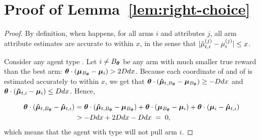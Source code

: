 \section{Proof of Lemma~\ref{lem:right-choice}}
\label{sec:lemma7-proof}


\begin{proof}
By definition, when  happens,
for all arms $i$ and attributes $j$,
all arm attribute estimates are accurate to within $x$,
in the sense that
$|\hat{\mu}_{t,i}^{(j)} - \mu_{i}^{(j)}| \leq x$.

Consider any agent type \AgV.
Let $i \neq B_{\bm{\theta}}$ be any arm
with much smaller true reward than the best arm:
$\bm{\theta} \cdot (\bm{\mu}_{B_{\bm{\theta}}} - \bm{\mu}_{i}) > 2D d x$.
Because each coordinate of  and of
 is estimated accurately to within $x$, 
we get that 
$\bm{\theta} \cdot (\bm{\hat{\mu}}_{t,B_{\bm{\theta}}} - \bm{\mu}_{B_{\bm{\theta}}})
\geq - D d x$
and
$\bm{\theta} \cdot (\bm{\hat{\mu}}_{t,i} - \bm{\mu}_{i}) \leq D d x$.
Hence, 

\begin{align}
\bm{\theta} \cdot (\bm{\hat{\mu}}_{t,B_{\bm{\theta}}} - \bm{\hat{\mu}}_{t,i})
& =
\bm{\theta} \cdot (\bm{\hat{\mu}}_{t,B_{\bm{\theta}}} - \bm{\mu}_{B_{\bm{\theta}}})
+ \bm{\theta} \cdot (\bm{\mu}_{B_{\bm{\theta}}} - \bm{\mu}_{i})
+ \bm{\theta} \cdot (\bm{\mu}_{i} - \bm{\hat{\mu}}_{t,i}) \nonumber\\
& > -D d x + 2 D d x - D d x
\; = \; 0, \label{equ:choice}
\end{align}
which means that the agent with type \AgV will not pull arm $i$.
\end{proof}